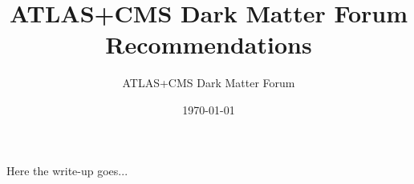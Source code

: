 \documentclass[a4,debug,notitlepage]{tufte-book}
\title{ATLAS+CMS Dark Matter Forum Recommendations}
\author{ATLAS+CMS Dark Matter Forum}
\date{\today}
\newcommand{\blankpage}{\newpage\hbox{}\thispagestyle{empty}\newpage}
\begin{document}
\morefloats
\setcounter{secnumdepth}{-1} %



\blankpage

Here the write-up goes...
\end{document}
